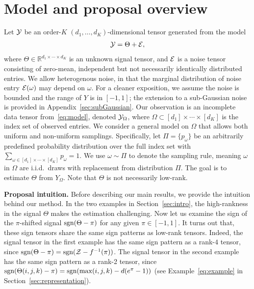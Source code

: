 \documentclass{article}
\theoremstyle{plain}
\theoremstyle{definition}
\def\sign{\textup{sgn}}
\begin{document}
\section{Model and proposal overview}\label{sec:overview}
Let $\mathcal{Y}$ be an order-$K$ $(d_1,\ldots,d_K)$-dimensional tensor generated from the model
\begin{equation}\label{eq:model}
\mathcal{Y}=\Theta+\mathcal{E},
\end{equation}
where $\Theta\in\mathbb{R}^{d_1\times \cdots \times d_K}$ is an unknown signal tensor, and $\mathcal{E}$ is a noise tensor consisting of zero-mean, independent but not necessarily identically distributed entries. We allow heterogenous noise, in that the marginal distribution of noise entry $\mathcal{E}(\omega)$ may depend on $\omega$. For a cleaner exposition, we assume the noise is bounded and the range of $Y$ is in $[-1,1]$; the extension to a sub-Gaussian noise is provided in Appendix~\ref{sec:subGaussian}. Our observation is an incomplete data tensor from~\eqref{eq:model}, denoted  $\mathcal{Y}_\Omega$, where $\Omega\subset[d_1]\times\cdots\times[d_K]$ is the index set of observed entries. We consider a general model on $\Omega$ that allows both uniform and non-uniform samplings. Specifically, let $\Pi=\{p_\omega\}$ be an arbitrarily predefined probability distribution over the full index set with $\sum_{\omega\in[d_1]\times \cdots \times [d_K]}p_\omega=1$. We use $\omega\sim \Pi$ to denote the sampling rule, meaning $\omega$ in $\Omega$ are i.i.d.\ draws with replacement from distribution $\Pi$. The goal is to estimate $\Theta$ from $Y_{\Omega}$. Note that $\Theta$ is not necessarily low-rank. 

{\bf Proposal intuition.} Before describing our main results, we provide the intuition behind our method. In the two examples in Section~\ref{sec:intro}, the high-rankness in the signal $\Theta$ makes the estimation challenging. Now let us examine the sign of the $\pi$-shifted signal $\sign(\Theta-\pi)$ for any given $\pi\in[-1,1]$. It turns out that, these sign tensors share the same sign patterns as low-rank tensors. Indeed, the signal tensor in the first example has the same sign pattern as a rank-$4$ tensor, since $\sign(\Theta-\pi)=\sign(\tZ-f^{-1}(\pi))$. The signal tensor in the second example has the same sign pattern as a rank-2 tensor, since $\sign(\Theta(i,j,k)-\pi)=\sign(\max(i,j,k)-d(e^{\pi}-1))$ (see Example~\ref{eq:example} in Section~\ref{sec:representation}).
\end{document}

